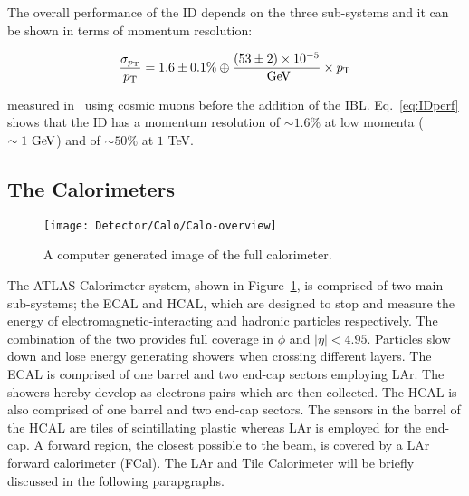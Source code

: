 				The overall performance of the \ac{ID} depends on the three sub-systems and it can be shown in terms of momentum resolution: 

				\begin{equation}
				\label{eq:IDperf}
					\displaystyle \frac{\sigma_{\pt}}{\pt} = 1.6 \pm 0.1\% \oplus \frac{(53 \pm 2) \times 10^{-5}}{\GeV} \times \pt
				\end{equation}

				\noindent measured in~\cite{Aad2011} using cosmic muons before the addition of the \ac{IBL}. Eq.~\ref{eq:IDperf} shows that the \ac{ID} has a momentum resolution of $\sim 1.6\%$ at low momenta ($\sim 1 \GeV$) and of $\sim 50\%$ at $1$ TeV.

		\subsection{The Calorimeters}

			\begin{figure}[!htb]
				\centering
				\texttt{[image: Detector/Calo/Calo-overview]}
				\caption{A computer generated image of the full calorimeter.}
				\label{fig:Calo}
			\end{figure}

			The \ac{ATLAS} Calorimeter system, shown in Figure~\ref{fig:Calo}, is comprised of two main sub-systems; the \ac{ECAL} and \ac{HCAL}, which are designed to stop and measure the energy of electromagnetic-interacting and hadronic particles respectively. The combination of the two provides full coverage in $\phi$ and $\left | \eta \right | < 4.95$. Particles slow down and lose energy generating showers when crossing different layers. The \ac{ECAL} is comprised of one barrel and two end-cap sectors employing \ac{LAr}. The showers hereby develop as electrons pairs which are then collected. The \ac{HCAL} is also comprised of one barrel and two end-cap sectors. The sensors in the barrel of the \ac{HCAL} are tiles of scintillating plastic whereas \ac{LAr} is employed for the end-cap. A forward region, the closest possible to the beam, is covered by a \ac{LAr} forward calorimeter (FCal). The \ac{LAr} and Tile Calorimeter will be briefly discussed in the following parapgraphs. 

